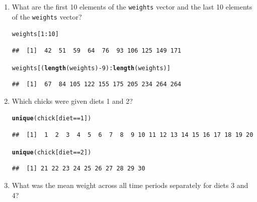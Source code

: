 \documentclass{tufte-book}\usepackage[]{graphicx}\usepackage[]{color}
\makeatletter
\newcommand{\hlnum}[1]{\textcolor[rgb]{0.686,0.059,0.569}{#1}}%
\newcommand{\hlopt}[1]{\textcolor[rgb]{0,0,0}{#1}}%
\newcommand{\hlstd}[1]{\textcolor[rgb]{0.345,0.345,0.345}{#1}}%
\newcommand{\hlkwd}[1]{\textcolor[rgb]{0.737,0.353,0.396}{\textbf{#1}}}%
\newenvironment{kframe}{%
 \def\at@end@of@kframe{}%
 \ifinner\ifhmode%
  \def\at@end@of@kframe{\end{minipage}}%
  \begin{minipage}{\columnwidth}%
 \fi\fi%
 \def\FrameCommand##1{\hskip\@totalleftmargin \hskip-\fboxsep
 \colorbox{shadecolor}{##1}\hskip-\fboxsep
     \hskip-\linewidth \hskip-\@totalleftmargin \hskip\columnwidth}%
 \MakeFramed {\advance\hsize-\width
   \@totalleftmargin\z@ \linewidth\hsize
   \@setminipage}}%
 {\par\unskip\endMakeFramed%
 \at@end@of@kframe}
\newenvironment{knitrout}{}{} %
\makeatother
\begin{document}
\begin{footnotesize}
\begin{enumerate}
  \item What are the first 10 elements of the \texttt{weights} vector and the last 10 elements of the \texttt{weights} vector?
  
\begin{knitrout}
\color{fgcolor}\begin{kframe}
\begin{alltt}
\hlstd{weights[}\hlnum{1}\hlopt{:}\hlnum{10}\hlstd{]}
\end{alltt}
\begin{verbatim}
##  [1]  42  51  59  64  76  93 106 125 149 171
\end{verbatim}
\begin{alltt}
\hlstd{weights[(}\hlkwd{length}\hlstd{(weights)} \hlopt{-} \hlnum{9}\hlstd{)}\hlopt{:}\hlkwd{length}\hlstd{(weights)]}
\end{alltt}
\begin{verbatim}
##  [1]  67  84 105 122 155 175 205 234 264 264
\end{verbatim}
\end{kframe}
\end{knitrout}
  
  \item Which chicks were given diets 1 and 2?
  
\begin{knitrout}
\color{fgcolor}\begin{kframe}
\begin{alltt}
\hlkwd{unique}\hlstd{(chick[diet} \hlopt{==} \hlnum{1}\hlstd{])}
\end{alltt}
\begin{verbatim}
##  [1]  1  2  3  4  5  6  7  8  9 10 11 12 13 14 15 16 17 18 19 20
\end{verbatim}
\begin{alltt}
\hlkwd{unique}\hlstd{(chick[diet} \hlopt{==} \hlnum{2}\hlstd{])}
\end{alltt}
\begin{verbatim}
##  [1] 21 22 23 24 25 26 27 28 29 30
\end{verbatim}
\end{kframe}
\end{knitrout}

  \item What was the mean weight across all time periods separately for diets 3 and 4?
  

\end{enumerate}
\end{footnotesize}
\end{document}

